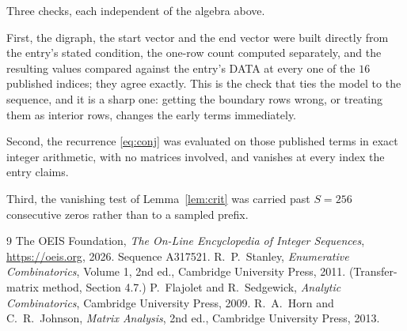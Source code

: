 \documentclass[11pt,a4paper]{article}
\theoremstyle{plain}
\theoremstyle{definition}
\begin{document}
Three checks, each independent of the algebra above.

First, the digraph, the start vector and the end vector were built directly from the
entry's stated condition, the one-row count computed separately, and the resulting values
compared against the entry's DATA at every one of the $16$ published indices; they
agree exactly. This is the check that ties the model to the sequence, and it is a sharp one:
getting the boundary rows wrong, or treating them as interior rows, changes the early terms
immediately.

Second, the recurrence \eqref{eq:conj} was evaluated on those published terms in exact
integer arithmetic, with no matrices involved, and vanishes at every index the entry claims.

Third, the vanishing test of Lemma~\ref{lem:crit} was carried past $S=256$ consecutive
zeros rather than to a sampled prefix.

\begin{thebibliography}{9}
 The OEIS Foundation, \emph{The On-Line Encyclopedia of Integer
Sequences}, \url{https://oeis.org}, 2026. Sequence A317521.
 R.~P.~Stanley, \emph{Enumerative Combinatorics}, Volume 1, 2nd ed.,
Cambridge University Press, 2011. (Transfer-matrix method, Section 4.7.)
 P.~Flajolet and R.~Sedgewick, \emph{Analytic Combinatorics}, Cambridge
University Press, 2009.
 R.~A.~Horn and C.~R.~Johnson, \emph{Matrix Analysis}, 2nd ed., Cambridge
University Press, 2013.
\end{thebibliography}
\end{document}
